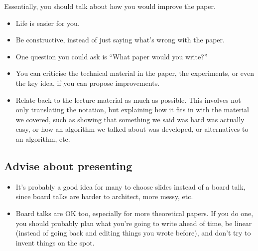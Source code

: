 \documentclass[twoside]{article}
\begin{document}
Essentially, you should talk about how you would improve the paper.

\begin{itemize}
\item Life is easier for you.
\item Be constructive, instead of just saying what's wrong with the paper.
\item One question you could ask is ``What paper would you write?''
\item You can criticise the technical material in the paper, the experiments, or even the key idea, if you can propose improvements.
  \item Relate back to the lecture material as much as possible. This involves not only translating the notation, but explaining how it fits in with the material we covered, such as showing that something we said was hard was actually easy, or how an algorithm we talked about was developed, or alternatives to an algorithm, etc.
\end{itemize}

\subsection{Advise about presenting}
\label{sec:advise-about-pres}

\begin{itemize}
\item It's probably a good idea for many to choose slides instead of a board talk, since board talks are harder to architect, more messy, etc.
\item Board talks are OK too, especially for more theoretical papers. If you do one, you should probably plan what you're going to write ahead of time, be linear (instead of going back and editing things you wrote before), and don't try to invent things on the spot.
\end{itemize}
\end{document}

